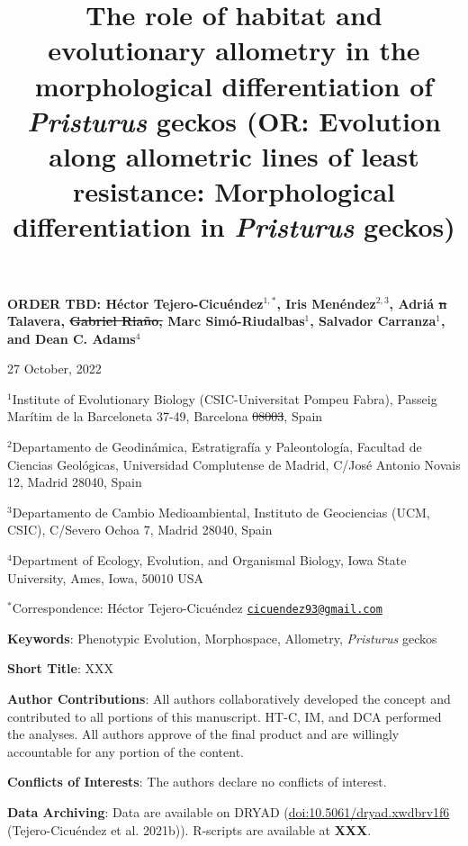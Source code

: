 \documentclass[
  11pt,
]{article}
\title{The role of habitat and evolutionary allometry in the
morphological differentiation of \emph{Pristurus} geckos (OR: Evolution
along allometric lines of least resistance: Morphological
differentiation in \emph{Pristurus} geckos)}
\author{}
\date{\vspace{-2.5em}}
\providecommand{\DIFaddtex}[1]{{\protect\color{blue}\uwave{#1}}} %
\providecommand{\DIFdeltex}[1]{{\protect\color{red}\sout{#1}}}                      %
\providecommand{\DIFaddbegin}{} %
\providecommand{\DIFaddend}{} %
\providecommand{\DIFdelbegin}{} %
\providecommand{\DIFdelend}{} %
\providecommand{\DIFadd}[1]{\texorpdfstring{\DIFaddtex{#1}}{#1}} %
\providecommand{\DIFdel}[1]{\texorpdfstring{\DIFdeltex{#1}}{}} %
\newcommand{\DIFscaledelfig}{0.5}
\newlength{\DIFdelgraphicswidth} %
\newlength{\DIFdelgraphicsheight} %
\newcommand{\DIFaddincludegraphics}[2][]{{\color{blue}\fbox{\DIFOincludegraphics[#1]{#2}}}} %
\newcommand{\DIFdelincludegraphics}[2][]{%
\sbox{\DIFdelgraphicsbox}{\DIFOincludegraphics[#1]{#2}}%
\settoboxwidth{\DIFdelgraphicswidth}{\DIFdelgraphicsbox} %
\settoboxtotalheight{\DIFdelgraphicsheight}{\DIFdelgraphicsbox} %
\scalebox{\DIFscaledelfig}{%
\parbox[b]{\DIFdelgraphicswidth}{\usebox{\DIFdelgraphicsbox}\\[-\baselineskip] \rule{\DIFdelgraphicswidth}{0em}}\llap{\resizebox{\DIFdelgraphicswidth}{\DIFdelgraphicsheight}{%
\setlength{\unitlength}{\DIFdelgraphicswidth}%
\begin{picture}(1,1)%
\thicklines\linethickness{2pt} %
{\color[rgb]{1,0,0}\put(0,0){\framebox(1,1){}}}%
{\color[rgb]{1,0,0}\put(0,0){\line( 1,1){1}}}%
{\color[rgb]{1,0,0}\put(0,1){\line(1,-1){1}}}%
\end{picture}%
}\hspace*{3pt}}} %
} %
\DeclareRobustCommand{\DIFaddbegin}{\DIFOaddbegin \let\includegraphics\DIFaddincludegraphics} %
\DeclareRobustCommand{\DIFaddend}{\DIFOaddend \let\includegraphics\DIFOincludegraphics} %
\DeclareRobustCommand{\DIFdelbegin}{\DIFOdelbegin \let\includegraphics\DIFdelincludegraphics} %
\DeclareRobustCommand{\DIFdelend}{\DIFOaddend \let\includegraphics\DIFOincludegraphics} %
\begin{document}
\maketitle

\begin{center}
\textbf{ORDER TBD:  H{\'{e}}ctor Tejero-Cicu{\'{e}}ndez$^{1,*}$,  Iris Men{\'{e}}ndez$^{2,3}$, Adri{\'{a}} \DIFdelbegin \DIFdel{n }\DIFdelend Talavera, \DIFdelbegin \DIFdel{Gabriel Riaño, }\DIFdelend Marc Sim{\'{o}}-Riudalbas$^{1}$, Salvador Carranza$^{1}$, and Dean C. Adams$^{4}$}
\end{center}

\begin{center}27 October, 2022\end{center}

\(^{1}\)Institute of Evolutionary Biology (CSIC-Universitat Pompeu
Fabra), Passeig Marítim de la Barceloneta 37-49, Barcelona \DIFdelbegin \DIFdel{08003}\DIFdelend \DIFaddbegin \DIFadd{08002}\DIFaddend , Spain

\(^{2}\)Departamento de Geodinámica, Estratigrafía y Paleontología,
Facultad de Ciencias Geológicas, Universidad Complutense de Madrid,
C/José Antonio Novais 12, Madrid 28040, Spain

\(^{3}\)Departamento de Cambio Medioambiental, Instituto de Geociencias
(UCM, CSIC), C/Severo Ochoa 7, Madrid 28040, Spain

\(^{4}\)Department of Ecology, Evolution, and Organismal Biology, Iowa
State University, Ames, Iowa, 50010 USA

\(^{*}\)Correspondence: Héctor Tejero-Cicuéndez
\href{mailto:cicuendez93@gmail.com}{\nolinkurl{cicuendez93@gmail.com}}

\hfill\break

\textbf{Keywords}: Phenotypic Evolution, Morphospace, Allometry,
\emph{Pristurus} geckos \hfill\break

\textbf{Short Title}: XXX \hfill\break

\textbf{Author Contributions}: All authors collaboratively developed the
concept and contributed to all portions of this manuscript. HT-C, IM,
and DCA performed the analyses. All authors approve of the final product
and are willingly accountable for any portion of the
content.\hfill\break

\textbf{Conflicts of Interests}: The authors declare no conflicts of
interest.\hfill\break

\textbf{Data Archiving}: Data are available on DRYAD
(\url{doi:10.5061/dryad.xwdbrv1f6} (Tejero-Cicuéndez et al. 2021b)).
R-scripts are available at \textbf{XXX}. \hfill\break
\end{document}
